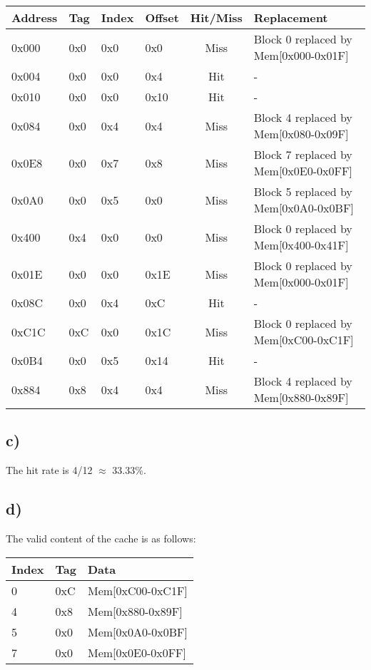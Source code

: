 \documentclass[a4paper,12pt]{article}
\begin{document}
\begin{table}[H]
	\centering
	\begin{tabular}{llllcl}
		\toprule
		Address & Tag & Index & Offset & Hit/Miss & Replacement \\
		\midrule
		0x000 & 0x0 & 0x0 & 0x0 & Miss & Block 0 replaced by Mem[0x000-0x01F] \\
		0x004 & 0x0 & 0x0 & 0x4 & Hit & - \\
		0x010 & 0x0 & 0x0 & 0x10 & Hit & - \\
		0x084 & 0x0 & 0x4 & 0x4 & Miss & Block 4 replaced by Mem[0x080-0x09F] \\
		0x0E8 & 0x0 & 0x7 & 0x8 & Miss & Block 7 replaced by Mem[0x0E0-0x0FF] \\
		0x0A0 & 0x0 & 0x5 & 0x0 & Miss & Block 5 replaced by Mem[0x0A0-0x0BF] \\
		0x400 & 0x4 & 0x0 & 0x0 & Miss & Block 0 replaced by Mem[0x400-0x41F] \\
		0x01E & 0x0 & 0x0 & 0x1E & Miss & Block 0 replaced by Mem[0x000-0x01F] \\
		0x08C & 0x0 & 0x4 & 0xC & Hit & - \\
		0xC1C & 0xC & 0x0 & 0x1C & Miss & Block 0 replaced by Mem[0xC00-0xC1F] \\
		0x0B4 & 0x0 & 0x5 & 0x14 & Hit & - \\
		0x884 & 0x8 & 0x4 & 0x4 & Miss & Block 4 replaced by Mem[0x880-0x89F] \\
		\bottomrule
	\end{tabular}
\end{table}

\subsection*{c)}

The hit rate is 4/12 $\approx$ 33.33\%.

\subsection*{d)}

The valid content of the cache is as follows:
\begin{table}[H]
	\centering
	\begin{tabular}{lll}
		\toprule
		Index & Tag & Data \\
		\midrule
		0 & 0xC & Mem[0xC00-0xC1F] \\
		4 & 0x8 & Mem[0x880-0x89F] \\
		5 & 0x0 & Mem[0x0A0-0x0BF] \\
		7 & 0x0 & Mem[0x0E0-0x0FF] \\
		\bottomrule
	\end{tabular}
\end{table}
\end{document}
